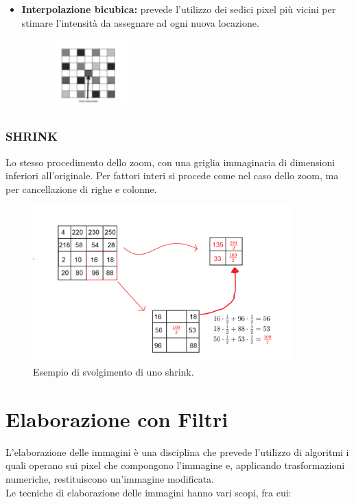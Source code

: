 \begin{itemize}
    \item \textbf{Interpolazione bicubica:} prevede l'utilizzo dei sedici pixel
          più vicini per stimare l'intensità da assegnare ad ogni nuova
          locazione.

          \begin{figure}[H]
              \centering
              \includegraphics[width=3cm, keepaspectratio]{capitoli/immagini/imgs/interpolazione-bicubica.png}
          \end{figure}

\end{itemize}


\subsection{SHRINK}

Lo stesso procedimento dello zoom, con una griglia immaginaria di dimensioni inferiori all'originale.
Per fattori interi si procede come nel caso dello zoom, ma per cancellazione di righe e colonne.

\begin{figure}[H]
    \centering
    \includegraphics[width=10cm, keepaspectratio]{capitoli/immagini/imgs/calcolo_shrink.png}
    \caption{Esempio di svolgimento di uno shrink.}
\end{figure}

\chapter{Elaborazione con Filtri}

L'elaborazione delle immagini è una disciplina che prevede l'utilizzo
di algoritmi i quali operano sui pixel che compongono l'immagine
e, applicando trasformazioni numeriche, restituiscono un'immagine
modificata.\\
Le tecniche di elaborazione delle immagini hanno vari scopi, fra cui:


